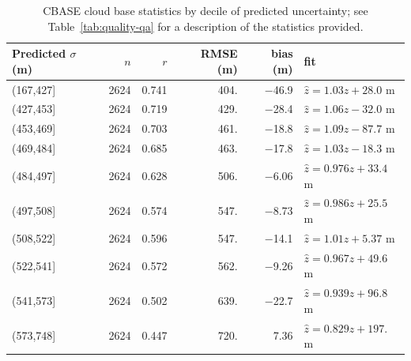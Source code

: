 \documentclass[essd,manuscript]{copernicus}\usepackage[]{graphicx}\usepackage[]{color}
\begin{document}
\begin{table}[t]
  \centering
  \caption{CBASE cloud base statistics by decile of predicted uncertainty; see
    Table~\ref{tab:quality-qa} for a description of the 
    statistics provided.}
  \label{tab:rmseclass}

\begin{tabular}{lrrrrl}
  \hline
\hline
Predicted $\sigma$ (m) & $n$ & $r$ & RMSE (m) & bias (m) & fit \\ 
  \hline
(167,427] & 2624 & 0.741 & 404. & $-$46.9 & $\hat{z} = 1.03 z + 28.0$ m \\ 
  (427,453] & 2624 & 0.719 & 429. & $-$28.4 & $\hat{z} = 1.06 z - 32.0$ m \\ 
  (453,469] & 2624 & 0.703 & 461. & $-$18.8 & $\hat{z} = 1.09 z - 87.7$ m \\ 
  (469,484] & 2624 & 0.685 & 463. & $-$17.8 & $\hat{z} = 1.03 z - 18.3$ m \\ 
  (484,497] & 2624 & 0.628 & 506. & $-$6.06 & $\hat{z} = 0.976 z + 33.4$ m \\ 
  (497,508] & 2624 & 0.574 & 547. & $-$8.73 & $\hat{z} = 0.986 z + 25.5$ m \\ 
  (508,522] & 2624 & 0.596 & 547. & $-$14.1 & $\hat{z} = 1.01 z + 5.37$ m \\ 
  (522,541] & 2624 & 0.572 & 562. & $-$9.26 & $\hat{z} = 0.967 z + 49.6$ m \\ 
  (541,573] & 2624 & 0.502 & 639. & $-$22.7 & $\hat{z} = 0.939 z + 96.8$ m \\ 
  (573,748] & 2624 & 0.447 & 720. & 7.36 & $\hat{z} = 0.829 z + 197.$ m \\ 
   \hline
\hline
\end{tabular}

\end{table}
\end{document}
